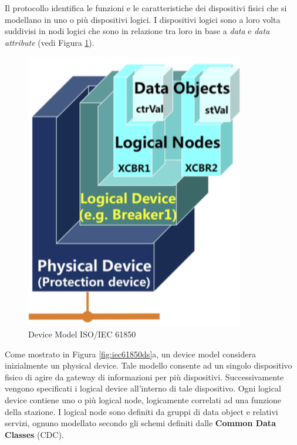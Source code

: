 Il protocollo identifica le funzioni e le caratteristiche dei dispositivi fisici che si modellano in uno o più dispositivi logici. I dispositivi logici sono a loro volta suddivisi in nodi logici che sono in relazione tra loro in base a \emph{data} e \emph{data attribute} (vedi Figura \ref{fig:iec61850ln}).
\begin{figure}[h]
	\centering
	\includegraphics[scale=0.350]{imgs/iec61850ln.png}
	\caption{Device Model ISO/IEC 61850} \label{fig:iec61850ln}
\end{figure}
\newpage
Come mostrato in Figura \ref{fig:iec61850ds}a, un device model considera inizialmente un physical device. Tale modello consente ad un singolo dispositivo fisico di agire da gateway di informazioni per più dispositivi. Successivamente vengono specificati i logical device all'interno di tale dispositivo. Ogni logical device contiene uno o più logical node, logicamente correlati ad una funzione della stazione. I logical node sono definiti da gruppi di data object e relativi servizi, ognuno modellato secondo gli schemi definiti dalle \textbf{Common Data Classes} (CDC).\newline
